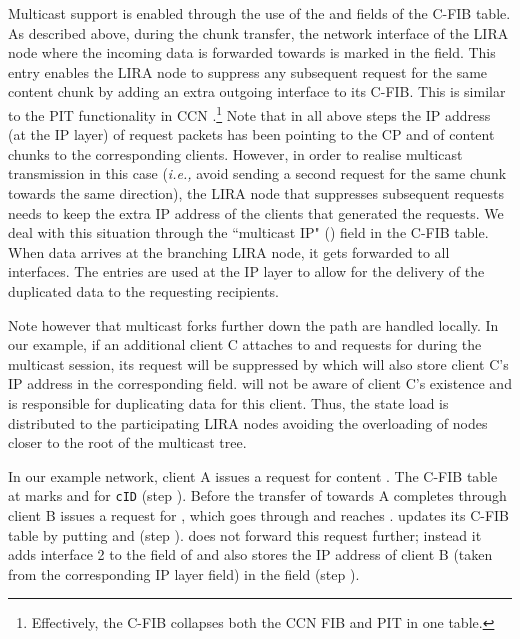 \documentclass{sig-alternate}
\newcommand{\ie}{{\em i.e.,\/ }}
\begin{document}
Multicast support is enabled through the use of the  and  fields of the C-FIB table. As described above, during the chunk transfer, the network interface of the LIRA node where the incoming data is forwarded towards is marked in the  field. This  entry enables the LIRA node to suppress any subsequent request for the same content chunk by adding an extra outgoing interface to its C-FIB. This is similar to the PIT functionality in CCN \cite{ccn}.\footnote{Effectively, the C-FIB collapses both the CCN FIB and PIT in one table.}
Note that in all above steps the IP address (at the IP layer) of request packets has been pointing to the CP and of content chunks to the corresponding clients. However, in order to realise multicast transmission in this case (\ie avoid sending a second request for the same chunk towards the same direction), the LIRA node that suppresses subsequent requests needs to keep the extra IP address of the clients that generated the requests. We deal with this situation through the ``multicast IP" () field in the C-FIB table. When data arrives at the branching LIRA node, it gets forwarded to all  interfaces. The  entries are used at the IP layer to allow for the delivery of the duplicated data to the requesting recipients.

Note however that multicast forks further down the path are handled locally. In our example, if an additional client C attaches to  and requests for  during the multicast session, its request will be suppressed by  which will also store client C's IP address in the corresponding  field.  will not be aware of client C's existence and  is responsible for duplicating data for this client. Thus, the  state load is distributed to the participating LIRA nodes avoiding the overloading of nodes closer to the root of the multicast tree.

In our example network, client A issues a request for content . The C-FIB table at  marks   and  for \texttt{cID}  (step ). Before the transfer of  towards A completes through  client B issues a request for , which goes through  and reaches .  updates its C-FIB table by putting  and  (step ).  does not forward this request further; instead it adds interface 2 to the  field of  and also stores the IP address of client B (taken from the corresponding IP layer field) in the  field (step ).
\end{document}
